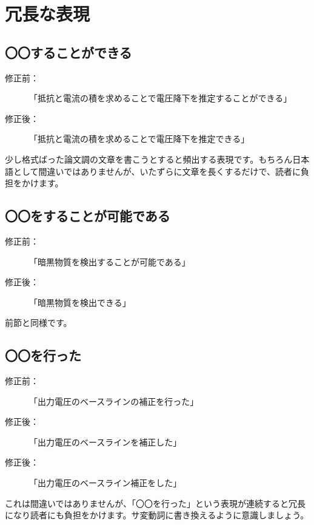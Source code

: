 
\section{冗長な表現}

\subsection{〇〇することができる}

\begin{description}
\item[修正前：]「抵抗と電流の積を求めることで電圧降下を推定することができる」
\item[修正後：]「抵抗と電流の積を求めることで電圧降下を推定できる」
\end{description}

少し格式ばった論文調の文章を書こうとすると頻出する表現です。もちろん日本語として間違いではありませんが、いたずらに文章を長くするだけで、読者に負担をかけます。

\subsection{〇〇をすることが可能である}

\begin{description}
\item[修正前：]「暗黒物質を検出することが可能である」
\item[修正後：]「暗黒物質を検出できる」
\end{description}

前節と同様です。

\subsection{〇〇を行った}

\begin{description}
\item[修正前：]「出力電圧のベースラインの補正を行った」
\item[修正後：]「出力電圧のベースラインを補正した」
\item[修正後：]「出力電圧のベースライン補正をした」
\end{description}

これは間違いではありませんが、「〇〇を行った」という表現が連続すると冗長になり読者にも負担をかけます。サ変動詞に書き換えるように意識しましょう。

